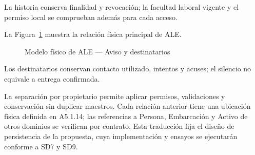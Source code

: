 La historia conserva finalidad y revocación; la facultad laboral vigente y el permiso local se comprueban además para cada acceso.

La Figura~\ref{fig:sd5_fisico_ale} muestra la relación física principal de ALE.

\begin{figure}[htbp]
\centering
{}
\caption{Modelo físico de ALE — Aviso y destinatarios}\label{fig:sd5_fisico_ale}
\end{figure}

Los destinatarios conservan contacto utilizado, intentos y acuses; el silencio no equivale a entrega confirmada.

La separación por propietario permite aplicar permisos, validaciones y conservación sin duplicar maestros. Cada relación anterior tiene una ubicación física definida en A5.1.14; las referencias a Persona, Embarcación y Activo de otros dominios se verifican por contrato. Esta traducción fija el diseño de persistencia de la propuesta, cuya implementación y ensayos se ejecutarán conforme a SD7 y SD9.
